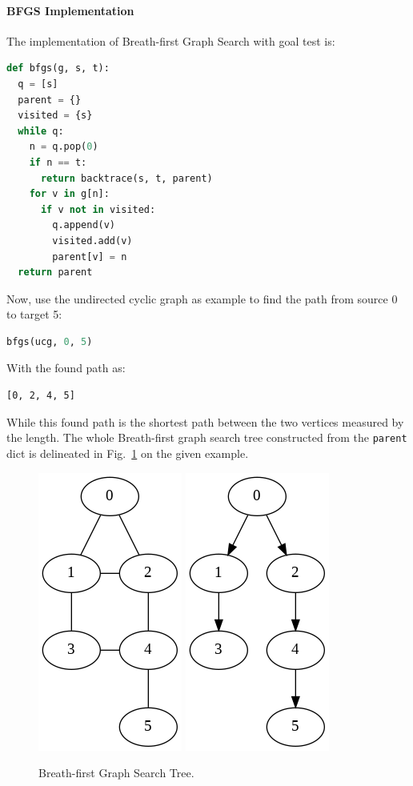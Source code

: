 \documentclass[../main.tex]{subfiles}
\begin{document}
\paragraph{BFGS Implementation} The implementation of Breath-first Graph Search with goal test is:
\begin{lstlisting}[language=Python]
def bfgs(g, s, t):
  q = [s]
  parent = {}
  visited = {s}
  while q:
    n = q.pop(0)
    if n == t:
      return backtrace(s, t, parent)
    for v in g[n]:
      if v not in visited:
        q.append(v)
        visited.add(v)
        parent[v] = n
  return parent
\end{lstlisting}
Now, use the undirected cyclic graph as example to find the path from source 0 to target 5:
\begin{lstlisting}[language=Python]
bfgs(ucg, 0, 5)
\end{lstlisting}
With the found path as:
\begin{lstlisting}[numbers=none]
[0, 2, 4, 5]
\end{lstlisting}
While this found path is the shortest path between the two vertices measured by the length. The whole Breath-first graph search tree constructed from the \texttt{parent} dict is delineated in Fig.~\ref{fig:breath_first_graph_search_tree} on the given example.
\begin{figure}[!ht]
    \centering
    \includegraphics[width=0.3\columnwidth]{fig/undirected_cyclic_graph.png}
     \includegraphics[width=0.3\columnwidth]{fig/breath_first_graph_search_tree.png}
  
    \caption{Breath-first Graph Search Tree.}
    \label{fig:breath_first_graph_search_tree}
\end{figure}
\end{document}
